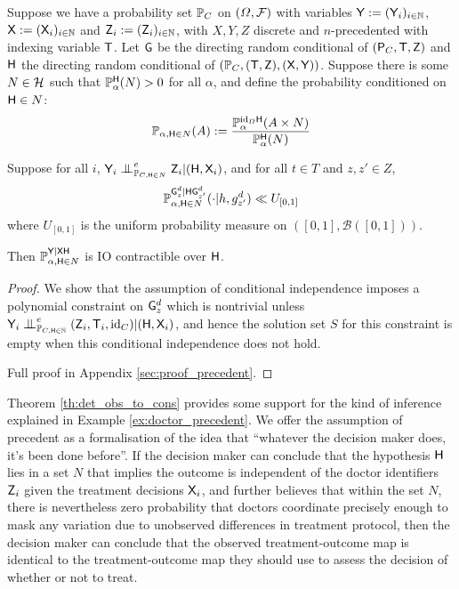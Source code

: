 \begin{theorem}\label{th:det_obs_to_cons}
Suppose we have a probability set $\mathbb{P}_C$ on $(\Omega,\mathcal{F})$ with variables $\mathsf{Y}:=(\mathsf{Y}_i)_{i\in \mathbb{N}}$, $\mathsf{X}:=(\mathsf{X}_i)_{i\in \mathbb{N}}$ and $\mathsf{Z}_i:= (\mathsf{Z}_i)_{i\in \mathbb{N}}$, with $X,Y,Z$ discrete and $n$-precedented with indexing variable $\mathsf{T}$. Let $\mathsf{G}$ be the directing random conditional of $(\mathsf{P}_C,\mathsf{T},\mathsf{Z})$ and $\mathsf{H}$ the directing random conditional of $(\mathbb{P}_C,(\mathsf{T},\mathsf{Z}),(\mathsf{X},\mathsf{Y}))$. Suppose there is some $N\in\mathcal{H}$ such that $\mathbb{P}_\alpha^{\mathsf{H}}(N)>0$ for all $\alpha$, and define the probability conditioned on $\mathsf{H}\in N$:
\begin{align}
\mathbb{P}_{\alpha,\mathsf{H}\in N} (A):= \frac{\mathbb{P}_\alpha^{\text{id}_\Omega \mathsf{H}}(A\times N)}{\mathbb{P}_\alpha^{\mathsf{H}}(N)}
\end{align}

Suppose for all $i$, $\RV{Y}_i\CI^e_{\prob{P}_{C,\RV{H}\in N}} \RV{Z}_i|(\RV{H},\RV{X}_i)$, and for all $t\in T$ and $z,z'\in Z$,
\begin{align}
    \mathbb{P}_{\alpha,\mathsf{H}\in N}^{\mathsf{G}^d_{z}|\mathsf{H}\mathsf{G}^d_{z'}}(\cdot|h,g^d_{z'}) \ll U_{[0,1]}\label{eq:lebesgue_dom}
\end{align}
where $U_{[0,1]}$ is the uniform probability measure on $([0,1],\mathcal{B}([0,1]))$.

Then $\mathbb{P}_{\alpha,\mathsf{H}\in N}^{\mathsf{Y}|\mathsf{X}\mathsf{H}}$ is IO contractible over $\mathsf{H}$.
\end{theorem}

\begin{proof}
We show that the assumption of conditional independence imposes a polynomial constraint on $\mathsf{G}^d_z$ which is nontrivial unless $\RV{Y}_i\CI^e_{\prob{P}_{C,\RV{H}\in\mathbb{N}}} (\RV{Z}_i,\RV{T}_i,\text{id}_C)|(\RV{H},\RV{X}_i)$, and hence the solution set $S$ for this constraint is empty when this conditional independence does not hold.

Full proof in Appendix \ref{sec:proof_precedent}.
\end{proof}

Theorem \ref{th:det_obs_to_cons} provides some support for the kind of inference explained in Example \ref{ex:doctor_precedent}. We offer the assumption of precedent as a formalisation of the idea that ``whatever the decision maker does, it's been done before''. If the decision maker can conclude that the hypothesis $\mathsf{H}$ lies in a set $N$ that implies the outcome is independent of the doctor identifiers $\mathsf{Z}_i$ given the treatment decisions $\mathsf{X}_i$, and further believes that within the set $N$, there is nevertheless zero probability that doctors coordinate precisely enough to mask any variation due to unobserved differences in treatment protocol, then the decision maker can conclude that the observed treatment-outcome map is identical to the treatment-outcome map they should use to assess the decision of whether or not to treat.

